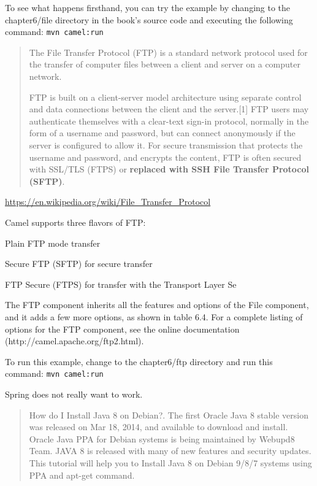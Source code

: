 \documentclass[Screen16to9,17pt]{foils}
\begin{document}
To see what happens firsthand, you can try the example by changing to the chapter6/file directory in the book’s source code and executing the following command:
\verb+mvn camel:run+


\begin{quote}
  The File Transfer Protocol (FTP) is a standard network protocol used for the transfer of computer files between a client and server on a computer network.

FTP is built on a client-server model architecture using separate control and data connections between the client and the server.[1] FTP users may authenticate themselves with a clear-text sign-in protocol, normally in the form of a username and password, but can connect anonymously if the server is configured to allow it. For secure transmission that protects the username and password, and encrypts the content, FTP is often secured with SSL/TLS (FTPS) or {\bf replaced with SSH File Transfer Protocol (SFTP)}.
\end{quote}

\url{https://en.wikipedia.org/wiki/File_Transfer_Protocol}


Camel supports three flavors of FTP:
\begin{list2}
\item Plain FTP mode transfer
\item  Secure FTP (SFTP) for secure transfer
\item  FTP Secure (FTPS) for transfer with the Transport Layer Se
\end{list2}

The FTP component inherits all the features and options of the File component, and it
adds a few more options, as shown in table 6.4. For a complete listing of options for the
FTP component, see the online documentation (http://camel.apache.org/ftp2.html).

To run this example, change to the chapter6/ftp directory and run this command:
\verb+mvn camel:run+

Spring does not really want to work.



\begin{quote}
How do I Install Java 8 on Debian?. The first Oracle Java 8 stable version was released on Mar 18, 2014, and available to download and install. Oracle Java PPA for Debian systems is being maintained by Webupd8 Team. JAVA 8 is released with many of new features and security updates. This tutorial will help you to Install Java 8 on Debian 9/8/7 systems using PPA and apt-get command.
\end{quote}
\end{document}
